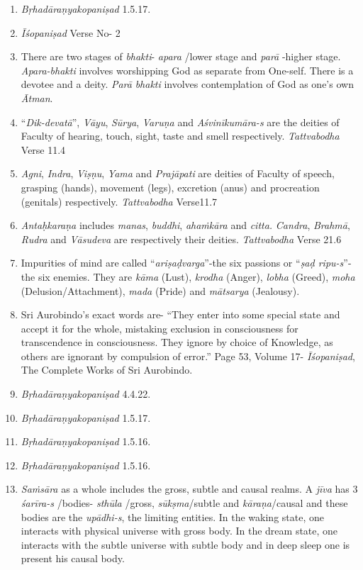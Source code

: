 \begin{enumerate}
\itemsep=1.2pt
\item
  \emph{Bṛhadāraṇyakopaniṣad} 1.5.17.
\item
  \emph{Īśopaniṣad} Verse No- 2
\item
  There are two stages of \emph{bhakti}- \emph{apara} /lower stage and \emph{parā} -higher stage. \emph{Apara-bhakti} involves worshipping God as separate from One-self. There is a devotee and a deity. \emph{Parā} \emph{bhakti} involves contemplation of God as one's own \emph{Ātman}.
\item
  ``\emph{Dik-devatā}'', \emph{Vāyu}, \emph{Sūrya}, \emph{Varuṇa} and \emph{Aśvinīkumāra-s} are the deities of Faculty of hearing, touch, sight, taste and smell respectively. \emph{Tattvabodha} Verse 11.4
\item
  \emph{Agni}, \emph{Indra}, \emph{Viṣṇu}, \emph{Yama} and \emph{Prajāpati} are deities of Faculty of speech, grasping (hands), movement (legs), excretion (anus) and procreation (genitals) respectively. \emph{Tattvabodha} Verse11.7
\item
  \emph{Antaḥkaraṇa} includes \emph{manas}, \emph{buddhi}, \emph{ahaṁkāra} and \emph{citta.} \emph{Candra}, \emph{Brahmā}, \emph{Rudra} and \emph{Vāsudeva} are respectively their deities. \emph{Tattvabodha} Verse 21.6
\item
  Impurities of mind are called ``\emph{ariṣaḍvarga}''-the six passions or ``\emph{ṣaḍ ripu-s}''- the six enemies. They are \emph{kāma} (Lust), \emph{krodha} (Anger), \emph{lobha} (Greed), \emph{moha} (Delusion/Attachment), \emph{mada} (Pride) and \emph{mātsarya} (Jealousy).
\item
  Sri Aurobindo's exact words are- ``They enter into some special state and accept it for the whole, mistaking exclusion in consciousness for transcendence in consciousness. They ignore by choice of Knowledge, as others are ignorant by compulsion of error.'' Page 53, Volume 17- \emph{Īśopaniṣad}, The Complete Works of Sri Aurobindo.
\item
  \emph{Bṛhadāraṇyakopaniṣad} 4.4.22.
\item
  \emph{Bṛhadāraṇyakopaniṣad} 1.5.17.
\item
  \emph{Bṛhadāraṇyakopaniṣad} 1.5.16.
\item
  \emph{Bṛhadāraṇyakopaniṣad} 1.5.16.
\item
  \emph{Saṁsāra} as a whole includes the gross, subtle and causal realms. A \emph{jīva} has 3 \emph{śarīra-s} /bodies- \emph{sthūla} /gross, \emph{sūkṣma}/subtle and \emph{kāraṇa}/causal and these bodies are the \emph{upādhi-s}, the limiting entities. In the waking state, one interacts with physical universe with gross body. In the dream state, one interacts with the subtle universe with subtle body and in deep sleep one is present his causal body.

  ­
\end{enumerate}
